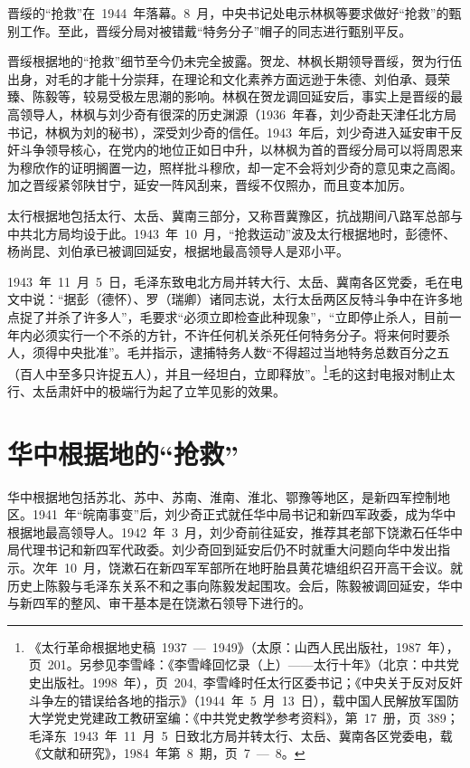 晋绥的“抢救”在~1944~年落幕。8~月，中央书记处电示林枫等要求做好“抢救”的甄别工作。至此，晋绥分局对被错戴“特务分子”帽子的同志进行甄别平反。

晋绥根据地的“抢救”细节至今仍未完全披露。贺龙、林枫长期领导晋绥，贺为行伍出身，对毛的才能十分崇拜，在理论和文化素养方面远逊于朱德、刘伯承、聂荣臻、陈毅等，较易受极左思潮的影响。林枫在贺龙调回延安后，事实上是晋绥的最高领导人，林枫与刘少奇有很深的历史渊源（1936~年春，刘少奇赴天津任北方局书记，林枫为刘的秘书），深受刘少奇的信任。1943~年后，刘少奇进入延安审干反奸斗争领导核心，在党内的地位正如日中升，以林枫为首的晋绥分局可以将周恩来为穆欣作的证明搁置一边，照样批斗穆欣，却一定不会将刘少奇的意见束之高阁。加之晋绥紧邻陕甘宁，延安一阵风刮来，晋绥不仅照办，而且变本加厉。

太行根据地包括太行、太岳、冀南三部分，又称晋冀豫区，抗战期间八路军总部与中共北方局均设于此。1943~年~10~月，“抢救运动”波及太行根据地时，彭德怀、杨尚昆、刘伯承已被调回延安，根据地最高领导人是邓小平。

1943~年~11~月~5~日，毛泽东致电北方局并转大行、太岳、冀南各区党委，毛在电文中说：“据彭（德怀）、罗（瑞卿）诸同志说，太行太岳两区反特斗争中在许多地点捉了并杀了许多人”，毛要求“必须立即检查此种现象”，“立即停止杀人，目前一年内必须实行一个不杀的方针，不许任何机关杀死任何特务分子。将来何时要杀人，须得中央批准”。毛并指示，逮捕特务人数“不得超过当地特务总数百分之五（百人中至多只许捉五人），并且一经坦白，立即释放”。\footnote{《太行革命根据地史稿~1937~—~1949》（太原：山西人民出版社，1987~年），页~201。另参见李雪峰：《李雪峰回忆录（上）——太行十年》（北京：中共党史出版社。1998~年），页~204,~李雪峰时任太行区委书记；《中央关于反对反奸斗争左的错误给各地的指示》（1944~年~5~月~13~日），载中国人民解放军国防大学党史党建政工教研室编：《中共党史教学参考资料》，第~17~册，页~389；毛泽东~1943~年~11~月~5~日致北方局并转太行、太岳、冀南各区党委电，载《文献和研究》，1984~年第~8~期，页~7~—~8。}毛的这封电报对制止太行、太岳肃奸中的极端行为起了立竿见影的效果。

\section{华中根据地的“抢救”}

华中根据地包括苏北、苏中、苏南、淮南、淮北、鄂豫等地区，是新四军控制地区。1941~年“皖南事变”后，刘少奇正式就任华中局书记和新四军政委，成为华中根据地最高领导人。1942~年~3~月，刘少奇前往延安，推荐其老部下饶漱石任华中局代理书记和新四军代政委。刘少奇回到延安后仍不时就重大问题向华中发出指示。次年~10~月，饶漱石在新四军军部所在地盱胎县黄花塘组织召开高干会议。就历史上陈毅与毛泽东关系不和之事向陈毅发起围攻。会后，陈毅被调回延安，华中与新四军的整风、审干基本是在饶漱石领导下进行的。

